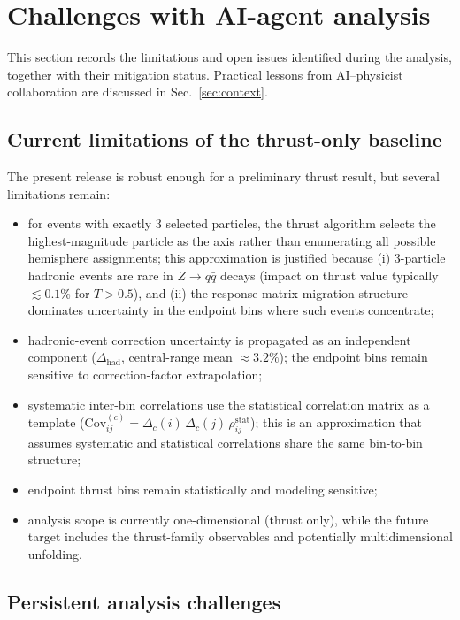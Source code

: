 \section{Challenges with AI-agent analysis}
\label{sec:challenges}

This section records the limitations and open issues identified during the analysis, together with their mitigation status. Practical lessons from AI--physicist collaboration are discussed in Sec.~\ref{sec:context}.

\subsection{Current limitations of the thrust-only baseline}

The present release is robust enough for a preliminary thrust result, but several limitations remain:
\begin{itemize}
\item for events with exactly 3 selected particles, the thrust algorithm selects the highest-magnitude particle as the axis rather than enumerating all possible hemisphere assignments; this approximation is justified because (i) 3-particle hadronic events are rare in $Z \to q\bar{q}$ decays (impact on thrust value typically $\lesssim 0.1\%$ for $T > 0.5$), and (ii) the response-matrix migration structure dominates uncertainty in the endpoint bins where such events concentrate;
\item hadronic-event correction uncertainty is propagated as an independent component ($\Delta_{\mathrm{had}}$, central-range mean $\approx 3.2\%$); the endpoint bins remain sensitive to correction-factor extrapolation;
\item systematic inter-bin correlations use the statistical correlation matrix as a template ($\mathrm{Cov}^{(c)}_{ij} = \Delta_c(i)\,\Delta_c(j)\,\rho^{\mathrm{stat}}_{ij}$); this is an approximation that assumes systematic and statistical correlations share the same bin-to-bin structure;
\item endpoint thrust bins remain statistically and modeling sensitive;
\item analysis scope is currently one-dimensional (thrust only), while the future target includes the thrust-family observables and potentially multidimensional unfolding.
\end{itemize}

\subsection{Persistent analysis challenges}

